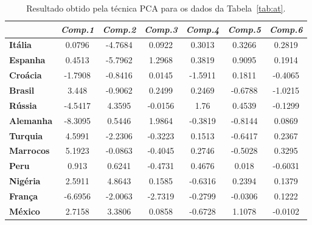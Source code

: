 \begin{table}[!h]
    \footnotesize
    \caption[Resultado de PCA]
    {Resultado obtido pela técnica PCA para os dados da
    Tabela~\ref{tab:at}.}
    \begin{center}
        \begin{tabular}{|l|c|c|c|c|c|c|}
            \hline
            & \multicolumn{1}{l|}{\textbf{\textit{Comp.1}}}
            & \multicolumn{1}{l|}{\textbf{\textit{Comp.2}}}
            & \multicolumn{1}{l|}{\textbf{\textit{Comp.3}}}
            & \multicolumn{1}{l|}{\textbf{\textit{Comp.4}}}
            & \multicolumn{1}{l|}{\textbf{\textit{Comp.5}}}
            & \multicolumn{1}{l|}{\textbf{\textit{Comp.6}}}
            \\ \hline
    \textbf{Itália} & 0.0796 & -4.7684 & 0.0922 & 0.3013 & 0.3266 & 0.2819 \\ \hline
    \textbf{Espanha} & 0.4513 & -5.7962 & 1.2968 & 0.3819 & 0.9095 & 0.1914 \\ \hline
    \textbf{Croácia} & -1.7908 & -0.8416 & 0.0145 & -1.5911 & 0.1811 & -0.4065 \\ \hline
    \textbf{Brasil} & 3.448 & -0.9062 & 0.2499 & 0.2469 & -0.6788 & -1.0215 \\ \hline
    \textbf{Rússia} & -4.5417 & 4.3595 & -0.0156 & 1.76 & 0.4539 & -0.1299 \\ \hline
    \textbf{Alemanha} & -8.3095 & 0.5446 & 1.9864 & -0.3819 & -0.8144 & 0.0869 \\ \hline
    \textbf{Turquia} & 4.5991 & -2.2306 & -0.3223 & 0.1513 & -0.6417 & 0.2367 \\ \hline
    \textbf{Marrocos} & 5.1923 & -0.0863 & -0.4045 & 0.2746 & -0.5028 & 0.3295 \\ \hline
    \textbf{Peru} & 0.913 & 0.6241 & -0.4731 & 0.4676 & 0.018 & -0.6031 \\ \hline
    \textbf{Nigéria} & 2.5911 & 4.8643 & 0.1585 & -0.6316 & 0.2394 & 0.1379 \\ \hline
    \textbf{França} & -6.6956 & -2.0063 & -2.7319 & -0.2799 & -0.0306 & 0.1222 \\ \hline
    \textbf{México} & 2.7158 & 3.3806 & 0.0858 & -0.6728 & 1.1078 & -0.0102 \\ \hline
        \end{tabular}
    \end{center}
    \label{tab:at-pcs}
\end{table}

